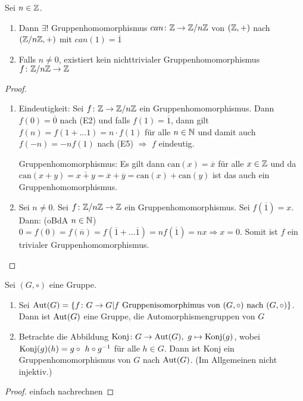 \documentclass[12pt,a4paper]{scrartcl}
\begin{document}
\begin{lem}
	Sei $n\in \mathbb Z$.
	\begin{enumerate}
		\item Dann $\exists!$ Gruppenhomomorphismus $can\colon \mathbb Z\to \mathbb Z/n\mathbb Z$ von $(\mathbb Z,+)$ nach $(\mathbb Z/n\mathbb Z,+)$ mit $can(1)=\overline{1}$
		\item Falls $n\neq 0$, existiert kein nichttrivialer Gruppenhomomorphismus $f\colon \mathbb Z/n\mathbb Z\to\mathbb Z$ 
	\end{enumerate}
\end{lem}
\begin{proof}
	\leavevmode
	\begin{enumerate}
		\item
	Eindeutigkeit: Sei $f\colon \mathbb Z\to \mathbb Z/n\mathbb Z$ ein Gruppenhomomorphismus. Dann $f(0)=\overline{0}$ nach (E2) und falls $f(1) = \overline{1}$, dann gilt $f(n)= f(1+\dots 1) = n\cdot f(1)$ für alle $n\in\mathbb N$ und damit auch $f(-n) = -nf(1)$ nach (E5) $\Rightarrow$ $f$ eindeutig.
	
	\noindent Gruppenhomomorphismus: Es gilt dann $\text{can}(x) = \overline{x}$ für alle $x\in\mathbb Z$ und da $\text{can}(x+y) = \overline{x+y} = \overline{x}+\overline{y} = \text{can}(x)+\text{can}(y)$ ist das auch ein Gruppenhomomorphismus.
	
	\item Sei $n\neq 0$. Sei $f\colon \mathbb Z/n\mathbb Z\to \mathbb Z$ ein Gruppenhomomorphismus. Sei $f(\overline{1})= x$. Dann: (oBdA $n\in\mathbb N$) $0=f(0)=f(\overline{n})= f(\overline{1}+\dots \overline{1})=nf(\overline{1})= nx\Rightarrow x=0$. Somit ist $f$ ein trivialer Gruppenhomomorphismus.
	\qedhere
	\end{enumerate}
\end{proof}

\begin{lem}
	Sei $(G,\circ)$ eine Gruppe.
	\begin{enumerate}
		\item Sei $\operatorname{Aut}(G) = \{f\colon G\to G| f \text{ Gruppenisomorphimus von $(G,\circ)$ nach }(G,\circ)\}$. Dann ist $\operatorname{Aut}(G)$ eine Gruppe, die Automorphismengruppen von $G$
		\item Betrachte die Abbildung $\operatorname{Konj}\colon G\to \operatorname{Aut}(G) ,\ g\mapsto \operatorname{Konj}(g)$, wobei $\operatorname{Konj}(g)(h)= g\circ\ h\circ g^{-1}$ für alle $h\in G$. Dann ist Konj ein Gruppenhomomorphismus von $G$ nach $\operatorname{Aut}(G)$. \textup(Im Allgemeinen nicht injektiv.\textup)
	\end{enumerate}
\end{lem}

\begin{proof}
	einfach nachrechnen
\end{proof}
\end{document}
